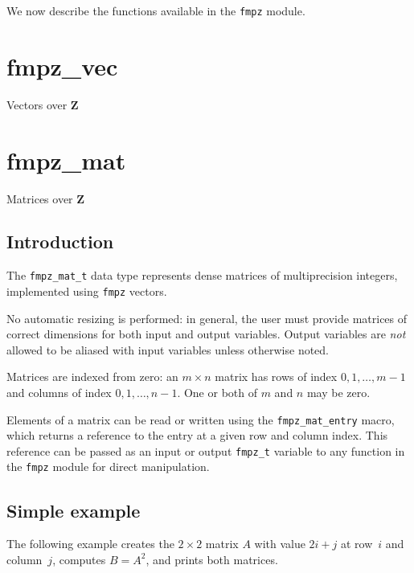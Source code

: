 \documentclass[a4paper,10pt]{book}
\newcommand{\Z}{\mathbf{Z}}%
\newcommand{\code}{\lstinline}
\begin{document}
We now describe the functions available in the \code{fmpz} module.




\chapter{fmpz\_vec}
\epigraph{Vectors over $\Z$}{}




\chapter{fmpz\_mat}
\epigraph{Matrices over $\Z$}{}

\section{Introduction}

The \code{fmpz_mat_t} data type represents dense matrices of multiprecision
integers, implemented using \code{fmpz} vectors.

No automatic resizing is performed: in general, the user must provide
matrices of correct dimensions for both input and output variables. Output
variables are \emph{not} allowed to be aliased with input variables unless
otherwise noted.

Matrices are indexed from zero: an $m \times n$ matrix
has rows of index $0,1,\ldots,m-1$ and columns of
index $0,1,\ldots,n-1$. One or both of $m$ and $n$ may be zero.

Elements of a matrix can be read or written using the \code{fmpz_mat_entry}
macro, which returns a reference to the entry at a given row and column index.
This reference can be passed as an input or output \code{fmpz_t} variable to 
any function in the \code{fmpz} module for direct manipulation.

\section{Simple example}
The following example creates the $2 \times 2$ matrix $A$ with
value $2i+j$ at row~$i$ and column~$j$, computes $B = A^2$,
and prints both matrices.
\end{document}
